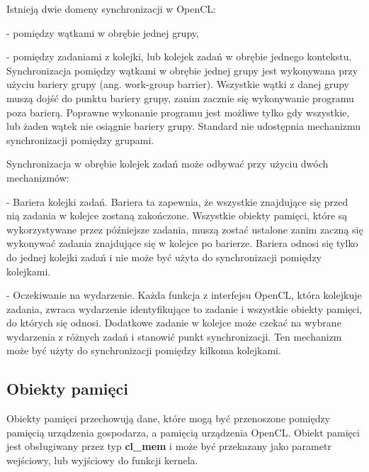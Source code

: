 Istnieją dwie domeny synchronizacji w OpenCL:

- pomiędzy wątkami w obrębie jednej grupy,

- pomiędzy zadaniami z kolejki, lub kolejek zadań w obrębie jednego kontekstu.\\

Synchronizacja pomiędzy wątkami w obrębie jednej grupy jest wykonywana przy użyciu bariery grupy (ang. work-group barrier). Wszystkie wątki z danej grupy muszą dojść do punktu bariery grupy, zanim zacznie się wykonywanie programu poza barierą. Poprawne wykonanie programu jest możliwe tylko gdy wszystkie, lub żaden wątek nie osiągnie bariery grupy. Standard nie udostępnia mechanizmu synchronizacji pomiędzy grupami.

Synchronizacja w obrębie kolejek zadań może odbywać przy użyciu dwóch mechanizmów:

- Bariera kolejki zadań. Bariera ta zapewnia, że wszystkie znajdujące się przed nią zadania w kolejce zostaną zakończone. Wszystkie obiekty pamięci, które są wykorzystywane przez późniejsze zadania, muszą zostać ustalone zanim zaczną się wykonywać zadania znajdujące się w kolejce po barierze. Bariera odnosi się tylko do jednej kolejki zadań i nie może być użyta do synchronizacji pomiędzy kolejkami. 

- Oczekiwanie na wydarzenie. Każda funkcja z interfejsu OpenCL, która kolejkuje zadania, zwraca wydarzenie identyfikujące to zadanie i wszystkie obiekty pamięci, do których się odnosi. Dodatkowe zadanie w kolejce może czekać na wybrane wydarzenia z różnych zadań i stanowić punkt synchronizacji. Ten mechanizm może być użyty do synchronizacji pomiędzy kilkoma kolejkami.

\subsection{Obiekty pamięci}\label{sec:OpenC61asdL}

Obiekty pamięci przechowują dane, które mogą być przenoszone pomiędzy pamięcią urządzenia gospodarza, a pamięcią urządzenia OpenCL. Obiekt pamięci jest obsługiwany przez typ \textbf{cl_mem} i może być przekazany jako parametr wejściowy, lub wyjściowy do funkcji kernela.

